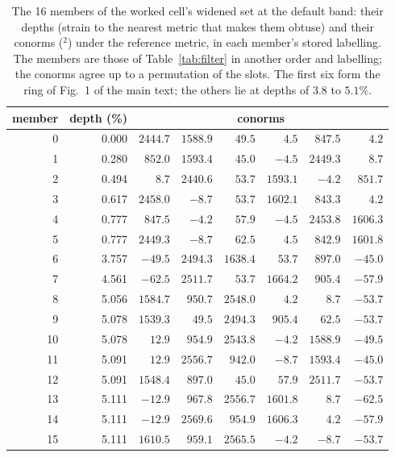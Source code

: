 \documentclass[preprint,pdf]{iucr}          %
\newcommand{\Ang}{\text{\AA}}
\begin{document}
\begin{table}
\caption{The 16 members of the worked cell's widened set at the default band: their depths (strain to the nearest metric that makes them obtuse) and their conorms (\Ang$^2$) under the reference metric, in each member's stored labelling. The members are those of Table~\ref{tab:filter} in another order and labelling; the conorms agree up to a permutation of the slots. The first six form the ring of Fig.~1 of the main text; the others lie at depths of $3.8$ to $5.1\%$.}
\label{tab:wf-members}
\begin{footnotesize}
\begin{tabular}{rrrrrrrr}
\toprule
member & depth (\%) & \multicolumn{6}{c}{conorms} \\
\midrule
0 & 0.000 & $2444.7$ & $1588.9$ & $49.5$ & $4.5$ & $847.5$ & $4.2$ \\
1 & 0.280 & $852.0$ & $1593.4$ & $45.0$ & $-4.5$ & $2449.3$ & $8.7$ \\
2 & 0.494 & $8.7$ & $2440.6$ & $53.7$ & $1593.1$ & $-4.2$ & $851.7$ \\
3 & 0.617 & $2458.0$ & $-8.7$ & $53.7$ & $1602.1$ & $843.3$ & $4.2$ \\
4 & 0.777 & $847.5$ & $-4.2$ & $57.9$ & $-4.5$ & $2453.8$ & $1606.3$ \\
5 & 0.777 & $2449.3$ & $-8.7$ & $62.5$ & $4.5$ & $842.9$ & $1601.8$ \\
6 & 3.757 & $-49.5$ & $2494.3$ & $1638.4$ & $53.7$ & $897.0$ & $-45.0$ \\
7 & 4.561 & $-62.5$ & $2511.7$ & $53.7$ & $1664.2$ & $905.4$ & $-57.9$ \\
8 & 5.056 & $1584.7$ & $950.7$ & $2548.0$ & $4.2$ & $8.7$ & $-53.7$ \\
9 & 5.078 & $1539.3$ & $49.5$ & $2494.3$ & $905.4$ & $62.5$ & $-53.7$ \\
10 & 5.078 & $12.9$ & $954.9$ & $2543.8$ & $-4.2$ & $1588.9$ & $-49.5$ \\
11 & 5.091 & $12.9$ & $2556.7$ & $942.0$ & $-8.7$ & $1593.4$ & $-45.0$ \\
12 & 5.091 & $1548.4$ & $897.0$ & $45.0$ & $57.9$ & $2511.7$ & $-53.7$ \\
13 & 5.111 & $-12.9$ & $967.8$ & $2556.7$ & $1601.8$ & $8.7$ & $-62.5$ \\
14 & 5.111 & $-12.9$ & $2569.6$ & $954.9$ & $1606.3$ & $4.2$ & $-57.9$ \\
15 & 5.111 & $1610.5$ & $959.1$ & $2565.5$ & $-4.2$ & $-8.7$ & $-53.7$ \\
\bottomrule
\end{tabular}
\end{footnotesize}
\end{table}
\end{document}
